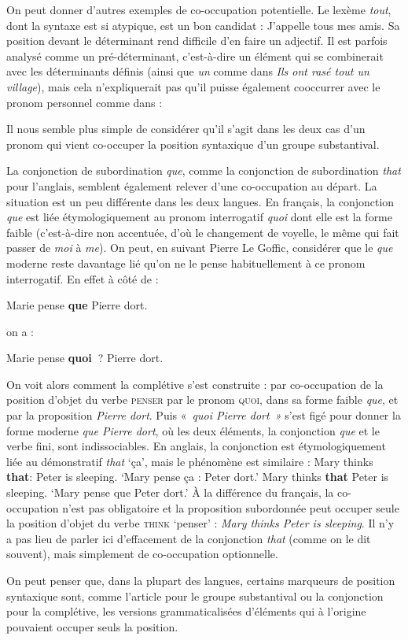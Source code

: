 {    On peut donner d’autres exemples de co-occupation potentielle. Le lexème \textit{tout}, dont la syntaxe est si atypique, est un bon candidat :
    \ea
    {J’appelle tous mes amis.}
    \z
    Sa position devant le déterminant rend difficile d’en faire un adjectif. Il est parfois analysé comme un pré-déterminant, c’est-à-dire un élément qui se combinerait avec les déterminants définis (ainsi que \textit{un} comme dans \textit{Ils ont rasé tout un village}), mais cela n’expliquerait pas qu’il puisse également cooccurrer avec le pronom personnel comme dans :

    \z

    Il nous semble plus simple de considérer qu’il s’agit dans les deux cas d’un pronom qui vient co-occuper la position syntaxique d’un groupe substantival.

    La conjonction de subordination \textit{que}, comme la conjonction de subordination \textit{that} pour l’anglais, semblent également relever d’une co-occupation au départ. La situation est un peu différente dans les deux langues. En français, la conjonction \textit{que} est liée étymologiquement au pronom interrogatif \textit{quoi} dont elle est la forme faible (c’est-à-dire non accentuée, d’où le changement de voyelle, le même qui fait passer de \textit{moi} à \textit{me}). On peut, en suivant Pierre Le Goffic, considérer que le \textit{que} moderne reste davantage lié qu’on ne le pense habituellement à ce pronom interrogatif. En effet à côté de :

    \ea
    {Marie pense} \textbf{{que}}  {Pierre dort.}
    \z

    on a :

    \ea
    {Marie pense} \textbf{{quoi~}}?  {Pierre dort.}
    \z

    On voit alors comment la complétive s’est construite : par co-occupation de la position d’objet du verbe \textsc{penser} par le pronom \textsc{quoi}, dans sa forme faible \textit{que}, et par la proposition \textit{Pierre dort}. Puis «~\textit{quoi Pierre dort~»} s’est figé pour donner la forme moderne \textit{que Pierre dort}, où les deux éléments, la conjonction \textit{que} et le verbe fini, sont indissociables. En anglais, la conjonction est étymologiquement liée au démonstratif \textit{that} ‘ça’, mais le phénomène est similaire :
    \ea
    {Mary thinks} \textbf{{that}}{:}  {Peter is sleeping.}    ‘Mary pense ça : Peter dort.’
    \z
    \ea
    {Mary thinks} \textbf{{that}}  {Peter is sleeping}.    ‘Mary pense que Peter dort.’
    \z
    À la différence du français, la co-occupation n’est pas obligatoire et la proposition subordonnée peut occuper seule la position d’objet du verbe \textsc{think} ‘penser’ : \textit{Mary thinks Peter is sleeping}. Il n’y a pas lieu de parler ici d’effacement de la conjonction \textit{that} (comme on le dit souvent), mais simplement de co-occupation optionnelle.

    On peut penser que, dans la plupart des langues, certains marqueurs de position syntaxique sont, comme l’article pour le groupe substantival ou la conjonction pour la complétive, les versions grammaticalisées d’éléments qui à l’origine pouvaient occuper seuls la position.
}
